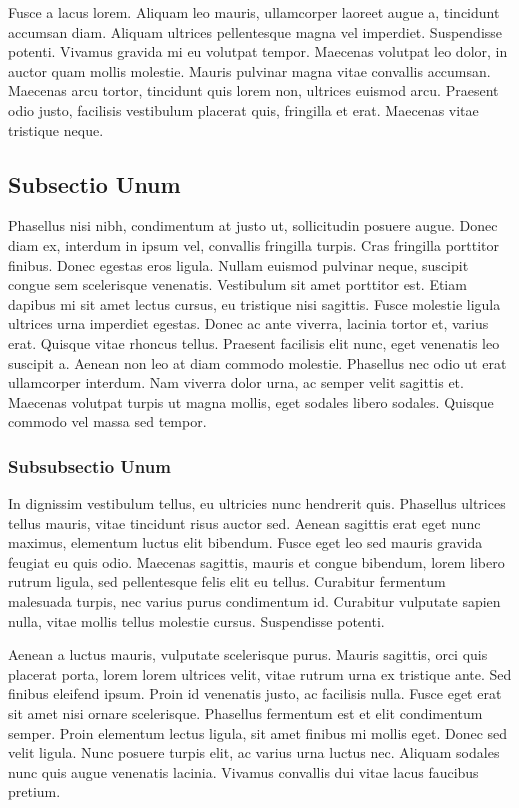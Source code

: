 Fusce a lacus lorem. Aliquam leo mauris, ullamcorper laoreet augue a, tincidunt accumsan diam. Aliquam ultrices pellentesque magna vel imperdiet. Suspendisse potenti. Vivamus gravida mi eu volutpat tempor. Maecenas volutpat leo dolor, in auctor quam mollis molestie. Mauris pulvinar magna vitae convallis accumsan. Maecenas arcu tortor, tincidunt quis lorem non, ultrices euismod arcu. Praesent odio justo, facilisis vestibulum placerat quis, fringilla et erat. Maecenas vitae tristique neque.

\subsection{Subsectio Unum}
Phasellus nisi nibh, condimentum at justo ut, sollicitudin posuere augue. Donec diam ex, interdum in ipsum vel, convallis fringilla turpis. Cras fringilla porttitor finibus. Donec egestas eros ligula. Nullam euismod pulvinar neque, suscipit congue sem scelerisque venenatis. Vestibulum sit amet porttitor est. Etiam dapibus mi sit amet lectus cursus, eu tristique nisi sagittis. Fusce molestie ligula ultrices urna imperdiet egestas. Donec ac ante viverra, lacinia tortor et, varius erat. Quisque vitae rhoncus tellus. Praesent facilisis elit nunc, eget venenatis leo suscipit a. Aenean non leo at diam commodo molestie. Phasellus nec odio ut erat ullamcorper interdum. Nam viverra dolor urna, ac semper velit sagittis et. Maecenas volutpat turpis ut magna mollis, eget sodales libero sodales. Quisque commodo vel massa sed tempor.

\subsubsection{Subsubsectio Unum}
In dignissim vestibulum tellus, eu ultricies nunc hendrerit quis. Phasellus ultrices tellus mauris, vitae tincidunt risus auctor sed. Aenean sagittis erat eget nunc maximus, elementum luctus elit bibendum. Fusce eget leo sed mauris gravida feugiat eu quis odio. Maecenas sagittis, mauris et congue bibendum, lorem libero rutrum ligula, sed pellentesque felis elit eu tellus. Curabitur fermentum malesuada turpis, nec varius purus condimentum id. Curabitur vulputate sapien nulla, vitae mollis tellus molestie cursus. Suspendisse potenti.

Aenean a luctus mauris, vulputate scelerisque purus. Mauris sagittis, orci quis placerat porta, lorem lorem ultrices velit, vitae rutrum urna ex tristique ante. Sed finibus eleifend ipsum. Proin id venenatis justo, ac facilisis nulla. Fusce eget erat sit amet nisi ornare scelerisque. Phasellus fermentum est et elit condimentum semper. Proin elementum lectus ligula, sit amet finibus mi mollis eget. Donec sed velit ligula. Nunc posuere turpis elit, ac varius urna luctus nec. Aliquam sodales nunc quis augue venenatis lacinia. Vivamus convallis dui vitae lacus faucibus pretium.

